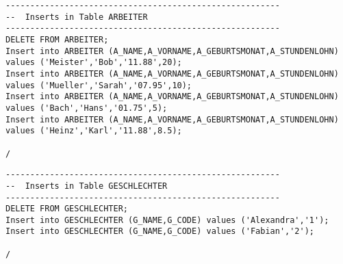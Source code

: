 \documentclass{scrartcl}
\begin{document}
\begin{lstlisting}
--------------------------------------------------------
--  Inserts in Table ARBEITER
--------------------------------------------------------
DELETE FROM ARBEITER;
Insert into ARBEITER (A_NAME,A_VORNAME,A_GEBURTSMONAT,A_STUNDENLOHN) values ('Meister','Bob','11.88',20);
Insert into ARBEITER (A_NAME,A_VORNAME,A_GEBURTSMONAT,A_STUNDENLOHN) values ('Mueller','Sarah','07.95',10);
Insert into ARBEITER (A_NAME,A_VORNAME,A_GEBURTSMONAT,A_STUNDENLOHN) values ('Bach','Hans','01.75',5);
Insert into ARBEITER (A_NAME,A_VORNAME,A_GEBURTSMONAT,A_STUNDENLOHN) values ('Heinz','Karl','11.88',8.5);

/
\end{lstlisting}

\begin{lstlisting}
--------------------------------------------------------
--  Inserts in Table GESCHLECHTER
--------------------------------------------------------
DELETE FROM GESCHLECHTER;
Insert into GESCHLECHTER (G_NAME,G_CODE) values ('Alexandra','1');
Insert into GESCHLECHTER (G_NAME,G_CODE) values ('Fabian','2');

/
\end{lstlisting}
\end{document}
